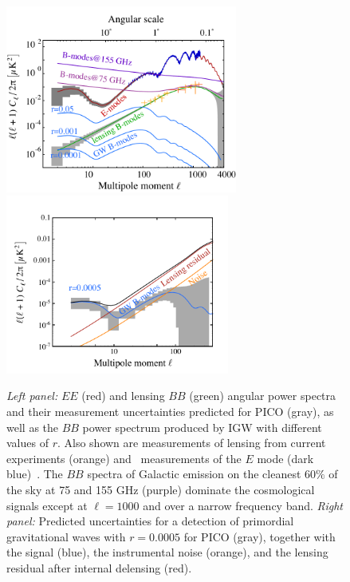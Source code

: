 \documentclass[PICOReport.tex]{subfiles}
\begin{document}
\begin{figure}[!thb]
\centering
\hspace{-0.15in}
\includegraphics[width=3in]{images/cmb_powspec_PICOv4p1_v2.pdf}
\hspace{-0.15in}
\includegraphics[width=2.9in,trim= 0cm 0.2cm 0cm 0cm]{images/cmbbb_powspec_PICOv4p1.pdf}
\caption{{\em Left panel:} $EE$ (red) and lensing $BB$ (green) angular power spectra and their measurement uncertainties predicted for PICO (gray), as well as the $BB$ power spectrum produced by \ac{IGW} with different values of $r$. Also shown are measurements of lensing from current experiments (orange) and \planck~measurements of the $E$ mode (dark blue)~\citep{polar+,planck?}. The $BB$ spectra of Galactic emission on the cleanest $60\%$ of the sky at 75 and 155 GHz (purple) dominate the cosmological signals except at $\ell=1000$ and over a narrow frequency band. 
{\em Right panel:} Predicted uncertainties for a detection of primordial gravitational waves with $r=0.0005$ for PICO (gray), together with the signal (blue), the instrumental noise (orange), and the lensing residual after internal delensing (red).}
\label{fig:clbb}
\end{figure}
\end{document}
